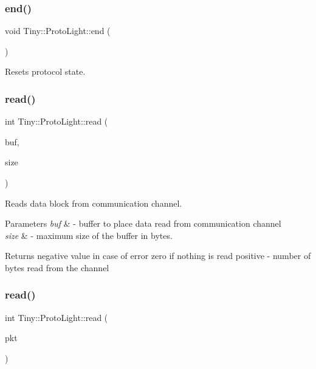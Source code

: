 \subsubsection{\texorpdfstring{end()}{end()}}
{\footnotesize\ttfamily void Tiny\+::\+Proto\+Light\+::end (\begin{DoxyParamCaption}{ }\end{DoxyParamCaption})}

Resets protocol state. \mbox{\label{classTiny_1_1ProtoLight_acf18a8b73ee6c6394270c903ad7882b8}} 
\subsubsection{\texorpdfstring{read()}{read()}\hspace{0.1cm}{\footnotesize\ttfamily [1/2]}}
{\footnotesize\ttfamily int Tiny\+::\+Proto\+Light\+::read (\begin{DoxyParamCaption}\item[{char $\ast$}]{buf,  }\item[{int}]{size }\end{DoxyParamCaption})}

Reads data block from communication channel. 
\begin{DoxyParams}{Parameters}
{\em buf} & -\/ buffer to place data read from communication channel \\
\hline
{\em size} & -\/ maximum size of the buffer in bytes. \\
\hline
\end{DoxyParams}
\begin{DoxyReturn}{Returns}
negative value in case of error zero if nothing is read positive -\/ number of bytes read from the channel 
\end{DoxyReturn}
\mbox{\label{classTiny_1_1ProtoLight_aa040cbf16f9c074959fb410db6858b9b}} 
\subsubsection{\texorpdfstring{read()}{read()}\hspace{0.1cm}{\footnotesize\ttfamily [2/2]}}
{\footnotesize\ttfamily int Tiny\+::\+Proto\+Light\+::read (\begin{DoxyParamCaption}\item[{\hyperlink{classTiny_1_1IPacket}{I\+Packet} \&}]{pkt }\end{DoxyParamCaption})}

